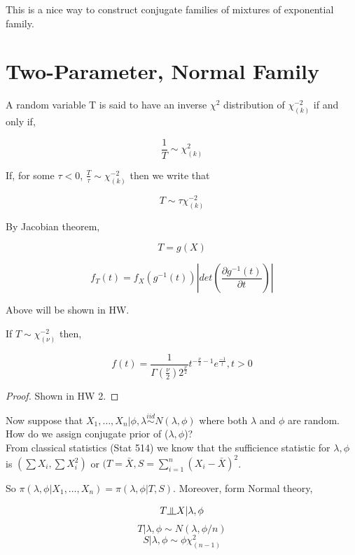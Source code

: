 \documentclass[11pt,fleqn]{book} %
\newcommand{\indep}{\rotatebox[origin=c]{90}{$\models$}}
\begin{document}
This is a nice way to construct conjugate families of mixtures of exponential family. 

\section{Two-Parameter,  Normal Family}

\begin{definition}
	A random variable T is said to have an inverse $\chi^2$ distribution of $\chi^{-2}_{(k)}$ if and only if, 

		$$\frac{1}{T} \sim \chi^2_{(k)} $$

	If, for some $\tau < 0$, $\frac{T}{\tau} \sim \chi^{-2}_{(k)}$ then we write that 

			$$T \sim \tau \chi^{-2}_{(k)} $$

	
\end{definition}

By Jacobian theorem, 

			$$T = g(X) $$

			$$f_T(t) = f_X(g^{-1}(t)) |det(\frac{\partial g^{-1}(t)}{\partial t})| $$

Above will be shown in HW. 

\begin{theorem}
	If $T \sim \chi^{-2}_{(\nu)}$ then, 

			$$f(t) = \frac{1}{\Gamma(\frac{\nu}{2}) 2^{\frac{\nu}{2}}} t^{-\frac{\nu}{2}-1} e^{\frac{-1}{t}}, t > 0 $$
\end{theorem}

\begin{proof}
	Shown in HW 2. 
\end{proof}

Now suppose that $X_1, \dots, X_n | \phi, \lambda \stackrel{iid}{\sim} N(\lambda, \phi)$ where both $\lambda$ and $\phi$ are random. How do we assign conjugate prior of ($\lambda, \phi$)?\\

From classical statistics (Stat 514) we know that the sufficience statistic for $\lambda, \phi$  is $(\sum X_i, \sum X_i^2)$ or $(T = \bar{X}, S = \sum^n_{i=1} (X_i -\bar{X})^2$. 


So $\pi(\lambda, \phi|X_1, \dots, X_n) = \pi(\lambda,\phi | T, S)$. Moreover, form Normal theory, 

		$$T \indep X | \lambda, \phi $$
		$$T | \lambda, \phi \sim N(\lambda, \phi/n) $$
		$$S | \lambda, \phi \sim \phi \chi^2_{(n-1)} $$
\end{document}
